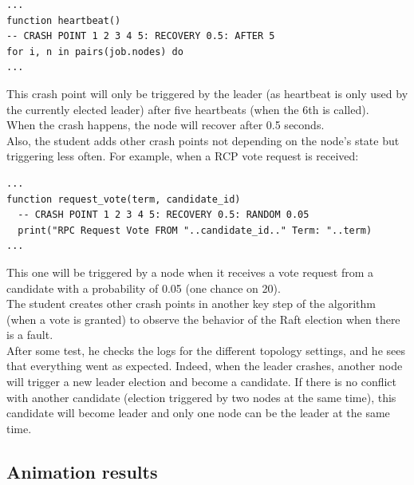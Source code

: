 \documentclass{eplmastersthesis}
\begin{document}
        \begin{lstlisting}[style=MyLua]
...
function heartbeat()
-- CRASH POINT 1 2 3 4 5: RECOVERY 0.5: AFTER 5
for i, n in pairs(job.nodes) do
...
        \end{lstlisting}

        This crash point will only be triggered by the leader (as heartbeat
        is only used by the currently elected leader) after five heartbeats
        (when the 6th is called).\\
        When the crash happens, the node will recover after 0.5 seconds.\\
        Also, the student adds other crash points not depending on the
        node's state but triggering less often. For example, when a RCP vote
        request is received:

        \begin{lstlisting}[style=MyLua]
...
function request_vote(term, candidate_id)
  -- CRASH POINT 1 2 3 4 5: RECOVERY 0.5: RANDOM 0.05
  print("RPC Request Vote FROM "..candidate_id.." Term: "..term)
...
        \end{lstlisting}

        This one will be triggered by a node when it receives a vote request
        from a candidate with a probability of 0.05 (one chance on 20).\\
        The student creates other crash points in another key step of
        the algorithm (when a vote is granted) to observe the behavior of
        the Raft election when there is a fault.\\

        After some test, he checks the logs for the different topology
        settings, and he sees that everything went as expected. Indeed, when
        the leader crashes, another node will trigger a new leader
        election and become a candidate. If there is no conflict with another
        candidate (election triggered by two nodes at the same time), this
        candidate will become leader and only one node can be the leader
        at the same time.

      \subsection{Animation results}
\end{document}
